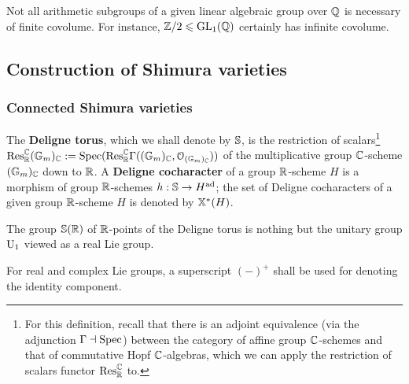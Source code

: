             \begin{remark}
                Not all arithmetic subgroups of a given linear algebraic group over $\mathbb{Q}$ is necessary of finite covolume. For instance, $\mathbb{Z}/2 \leqslant \operatorname{GL}_1(\mathbb{Q})$ certainly has infinite covolume.
            \end{remark}
            
    \subsection{Construction of Shimura varieties}    
        \subsubsection{Connected Shimura varieties}
            \begin{definition} \label{def: the_deligne_torus}
                The \textbf{Deligne torus}, which we shall denote by $\mathbb{S}$, is the restriction of scalars\footnote{For this definition, recall that there is an adjoint equivalence (via the adjunction $\Gamma \dashv \mathrm{Spec}$) between the category of affine group $\mathbb{C}$-schemes and that of commutative Hopf $\mathbb{C}$-algebras, which we can apply the restriction of scalars functor $\mathrm{Res}^{\mathbb{C}}_{\mathbb{R}}$ to.} $\mathrm{Res}^{\mathbb{C}}_{\mathbb{R}} (\mathbb{G}_m)_{\mathbb{C}} := \mathrm{Spec} ( \mathrm{Res}^{\mathbb{C}}_{\mathbb{R}} \Gamma((\mathbb{G}_m)_{\mathbb{C}}, \mathcal{O}_{(\mathbb{G}_m)_{\mathbb{C}}}) )$ of the multiplicative group $\mathbb{C}$-scheme $(\mathbb{G}_m)_{\mathbb{C}}$ down to $\mathbb{R}$. A \textbf{Deligne cocharacter} of a group $\mathbb{R}$-scheme $H$ is a morphism of group $\mathbb{R}$-schemes $h: \mathbb{S} \to H^{\mathrm{ad}}$; the set of Deligne cocharacters of a given group $\mathbb{R}$-scheme $H$ is denoted by $\mathbb{X}^*(H)$.
            \end{definition}
            \begin{remark}
                The group $\mathbb{S}(\mathbb{R})$ of $\mathbb{R}$-points of the Deligne torus is nothing but the unitary group $\mathrm{U}_1$ viewed as a real Lie group.
            \end{remark}
            \begin{convention}
                For real and complex Lie groups, a superscript $(-)^+$ shall be used for denoting the identity component.
            \end{convention}

